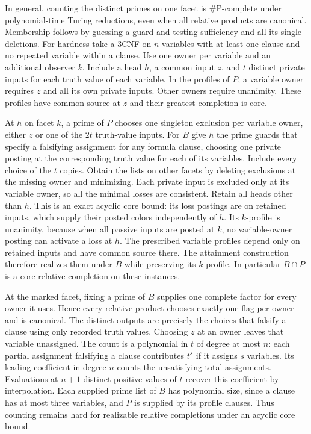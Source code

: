 In general, counting the distinct primes on one facet
is \#P-complete under polynomial-time Turing reductions,
even when all relative products are canonical. Membership
follows by guessing a guard and testing sufficiency and
all its single deletions. For hardness take a 3CNF on $n$
variables with at least one clause and no repeated
variable within a clause.
Use one owner per variable and an additional observer
$k$. Include a head $h$, a common input $z$, and $t$
distinct private inputs for each truth value of each
variable. In the profiles of $P$, a variable owner
requires $z$ and all its own private inputs. Other
owners require unanimity. These profiles have common
source at $z$ and their greatest completion is core.

At $h$ on facet $k$, a prime of $P$ chooses one
singleton exclusion per variable owner, either $z$
or one of the $2t$ truth-value inputs. For $B$ give
$h$ the prime guards that specify a falsifying
assignment for any formula clause, choosing one
private posting at the corresponding truth value
for each of its variables. Include every choice
of the $t$ copies. Obtain the lists on other facets
by deleting exclusions at the missing owner and
minimizing. Each private input is excluded only at
its variable owner, so all the minimal losses are
consistent. Retain all heads other than $h$.
This is an exact acyclic core bound: its loss
postings are on retained inputs, which supply
their posted colors independently of $h$.
Its $k$-profile is unanimity, because when all passive
inputs are posted at $k$, no variable-owner posting
can activate a loss at $h$. The prescribed variable
profiles depend only on retained inputs and have
common source there. The attainment construction
therefore realizes them under $B$ while preserving
its $k$-profile. In particular $B\cap P$ is a core
relative completion on these instances.

At the marked facet, fixing a prime of $B$ supplies
one complete factor for every owner it uses. Hence
every relative product chooses exactly one flag
per owner and is canonical. The distinct outputs
are precisely the choices that falsify a clause
using only recorded truth values. Choosing $z$
at an owner leaves that variable unassigned. The
count is a polynomial in $t$ of degree at most $n$:
each partial assignment falsifying a clause contributes
$t^s$ if it assigns $s$ variables. Its leading
coefficient in degree $n$ counts the unsatisfying
total assignments. Evaluations at $n+1$ distinct
positive values of $t$ recover this coefficient
by interpolation. Each supplied prime list of $B$
has polynomial size, since a clause has at most
three variables, and $P$ is supplied by its profile
clauses. Thus counting remains hard for realizable
relative completions under an acyclic core bound.

